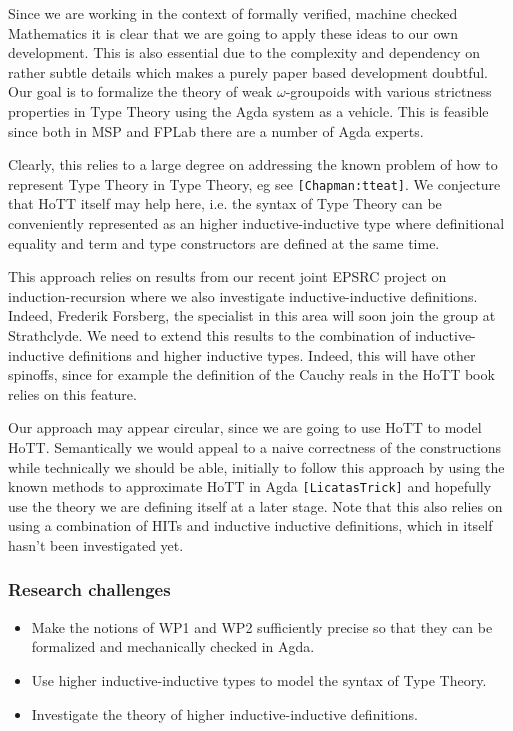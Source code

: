 \documentclass[twocolumn,a4paper,11pt]{article}
\renewcommand{\cite}[1]{{\tt[#1]}}
\begin{document}
Since we are working in the context of formally verified, machine
checked Mathematics it is clear that we are going to apply these ideas
to our own development. This is also essential due to the complexity
and dependency on rather subtle details which makes a purely paper
based development doubtful. Our goal is to formalize the theory of
weak $\omega$-groupoids with various strictness properties in Type
Theory using the Agda system as a vehicle. This is feasible since both
in MSP and FPLab there are a number of Agda experts. 

Clearly, this relies to a large degree on addressing the known problem
of how to represent Type Theory in Type Theory, eg see
\cite{Chapman:tteat}. We conjecture that HoTT itself may help here,
i.e. the syntax of Type Theory can be conveniently represented as an
higher inductive-inductive type where definitional equality and term
and type constructors are defined at the same time. 

This approach relies on results from our recent joint EPSRC project on 
induction-recursion where we also investigate inductive-inductive
definitions. Indeed, Frederik Forsberg, the specialist in this area
will soon join the group at Strathclyde. We need to extend this
results to the combination of inductive-inductive definitions and
higher inductive types. Indeed, this will have other spinoffs, since
for example the definition of the Cauchy reals in the HoTT book relies
on this feature.

Our approach may appear circular, since we are going to use HoTT to
model HoTT. Semantically we would appeal to a naive correctness of the
constructions while technically we should be able, initially to follow
this approach by using the known methods to approximate HoTT in Agda
\cite{LicatasTrick}  and hopefully use the theory we are defining
itself at a later stage. Note that this also relies on using a
combination of HITs and inductive inductive definitions, which in
itself hasn't been investigated yet.

\subsubsection*{Research challenges}

\begin{itemize}
\item Make the notions of WP1 and WP2 sufficiently precise so that they
  can be formalized and mechanically checked in Agda.

\item Use higher inductive-inductive types to model the syntax of Type
  Theory. 

\item Investigate the theory of higher inductive-inductive
  definitions.

\end{itemize}
\end{document}
